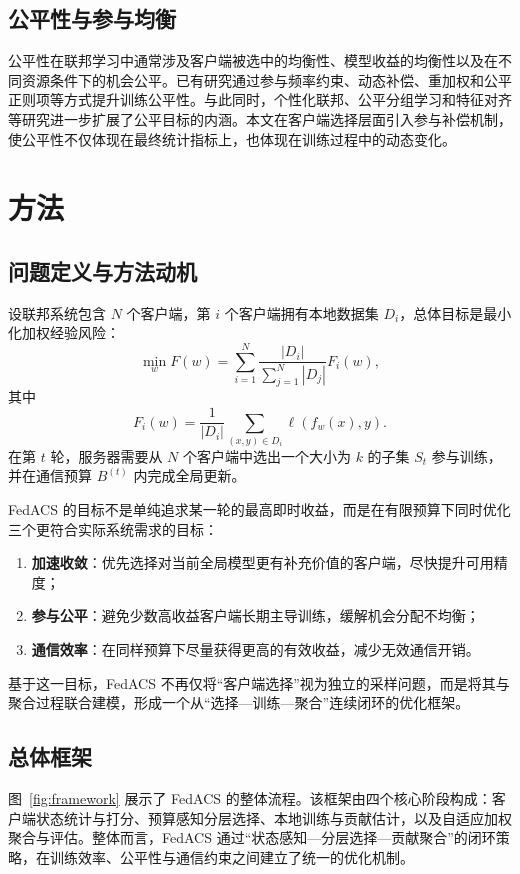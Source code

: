 \documentclass[UTF8,11pt]{ctexart}
\begin{document}
\subsection{公平性与参与均衡}
公平性在联邦学习中通常涉及客户端被选中的均衡性、模型收益的均衡性以及在不同资源条件下的机会公平\cite{shi2023towards,ezzeldin2023fairfed,liu2024fairness,wang2025resource}。已有研究通过参与频率约束、动态补偿、重加权和公平正则项等方式提升训练公平性\cite{mao2024federated,ezzeldin2023fairfed,liu2024fairness}。与此同时，个性化联邦、公平分组学习和特征对齐等研究进一步扩展了公平目标的内涵\cite{zhang2023fedala,xu2024personalized,qu2024generalized}。本文在客户端选择层面引入参与补偿机制，使公平性不仅体现在最终统计指标上，也体现在训练过程中的动态变化。

\section{方法}
\subsection{问题定义与方法动机}
设联邦系统包含 $N$ 个客户端，第 $i$ 个客户端拥有本地数据集 $D_i$，总体目标是最小化加权经验风险：
\begin{equation}
\min_{w} F(w)=\sum_{i=1}^{N}\frac{|D_i|}{\sum_{j=1}^{N}|D_j|}F_i(w),
\end{equation}
其中
\begin{equation}
F_i(w)=\frac{1}{|D_i|}\sum_{(x,y)\in D_i}\ell(f_w(x),y).
\end{equation}
在第 $t$ 轮，服务器需要从 $N$ 个客户端中选出一个大小为 $k$ 的子集 $S_t$ 参与训练，并在通信预算 $B^{(t)}$ 内完成全局更新。

FedACS 的目标不是单纯追求某一轮的最高即时收益，而是在有限预算下同时优化三个更符合实际系统需求的目标：
\begin{enumerate}
  \item \textbf{加速收敛}：优先选择对当前全局模型更有补充价值的客户端，尽快提升可用精度；
  \item \textbf{参与公平}：避免少数高收益客户端长期主导训练，缓解机会分配不均衡；
  \item \textbf{通信效率}：在同样预算下尽量获得更高的有效收益，减少无效通信开销。
\end{enumerate}
基于这一目标，FedACS 不再仅将“客户端选择”视为独立的采样问题，而是将其与聚合过程联合建模，形成一个从“选择—训练—聚合”连续闭环的优化框架。

\subsection{总体框架}
图~\ref{fig:framework} 展示了 FedACS 的整体流程。该框架由四个核心阶段构成：客户端状态统计与打分、预算感知分层选择、本地训练与贡献估计，以及自适应加权聚合与评估。整体而言，FedACS 通过“状态感知—分层选择—贡献聚合”的闭环策略，在训练效率、公平性与通信约束之间建立了统一的优化机制。
\end{document}
